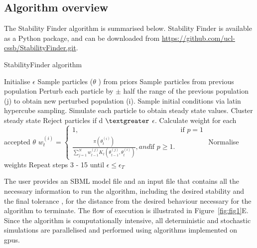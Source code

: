 \subsection{Algorithm overview}
\label{sec:Alg_overview}
The Stability Finder algorithm is summarised below. Stability Finder is available as a Python package, and can be downloaded from \url{https://github.com/ucl-cssb/StabilityFinder.git}. 

\begin{algorithm}[htbp]
\caption{StabilityFinder algorithm}
\label{alg:StabilityFinder}
 \begin{algorithmic}[1]
    \Statex
	\State Initialise $\epsilon$ 
		\State Sample particles ($\theta$ ) from priors
		\Else
			\State Sample particles from previous population
			\State Perturb each particle by $\pm$ half the range of the previous population (j) to obtain new perturbed population (i).
	\EndIf
	\State Sample initial conditions via latin hypercube sampling.
    \State Simulate each particle to obtain steady state values.
    \State Cluster steady state
	\State Reject particles if d $\textgreater$ $\epsilon$.
    \State Calculate weight for each accepted $\theta$
	\State $w_{t}^{(i)} = \begin{cases} 1, & \mbox{if } p = 1 \\\frac{\pi(\theta_{t}^{(i)})}{\sum_{j=1}^N w_{t-1}^{(j)} K_{t}(\theta_{t-1}^{(j)}, \theta_{t}^{(i)})}, and \mbox{if } p \geq  1. \end{cases}$
	\State Normalise weights
	\State Repeat steps 3 - 15 until $\epsilon \leq \epsilon_T$
  \end{algorithmic} 
\end{algorithm}
\clearpage
\noindent The user provides an SBML model file and an input file that contains all the necessary information to run the algorithm, including the desired stability and the final tolerance \textepsilon, for the distance from the desired behaviour necessary for the algorithm to terminate. The flow of execution is illustrated in Figure~\ref{fig:fig1}E. Since the algorithm is computationally intensive, all deterministic and stochastic simulations are parallelised and performed using algorithms implemented on \acrfull{gpu}s. 

